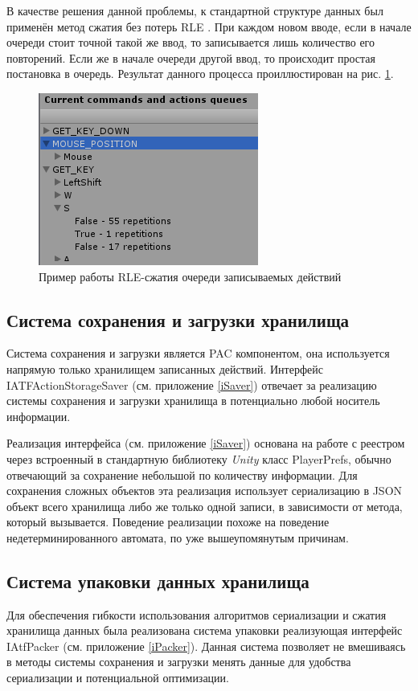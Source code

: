 В качестве решения данной проблемы, к стандартной структуре данных был применён метод сжатия без потерь RLE \cite{rle}. При каждом новом вводе, если в начале очереди стоит точной такой же ввод, то записывается лишь количество его повторений. Если же в начале очереди другой ввод, то происходит простая постановка в очередь. Результат данного процесса проиллюстирован на рис. \ref{storageContains}.

\begin{figure}[h]
	\centering
	\includegraphics[width=0.5\linewidth]{storageContains.png}
	\caption{Пример работы RLE-сжатия очереди записываемых действий}
	\label{storageContains}
\end{figure}

\subsection{Система сохранения и загрузки хранилища}
Система сохранения и загрузки является PAC компонентом, она используется напрямую только хранилищем записанных действий. Интерфейс IATFActionStorageSaver (см. приложение \ref{iSaver}) отвечает за реализацию системы сохранения и загрузки хранилища в потенциально любой носитель информации.

Реализация интерфейса (см. приложение \ref{iSaver}) основана на работе с реестром через встроенный в стандартную библиотеку \textit{Unity} класс PlayerPrefs, обычно отвечающий за сохранение небольшой по количеству информации. Для сохранения сложных объектов эта реализация использует сериализацию в JSON объект всего хранилища либо же только одной записи, в зависимости от метода, который вызывается. Поведение реализации похоже на поведение недетерминированного автомата, по уже вышеупомянутым причинам.

\subsection{Система упаковки данных хранилища}
Для обеспечения гибкости использования алгоритмов сериализации и сжатия хранилища данных была реализована система упаковки реализующая интерфейс IAtfPacker (см. приложение \ref{iPacker}). Данная система позволяет не вмешиваясь в методы системы сохранения и загрузки менять данные для удобства сериализации и потенциальной оптимизации.

